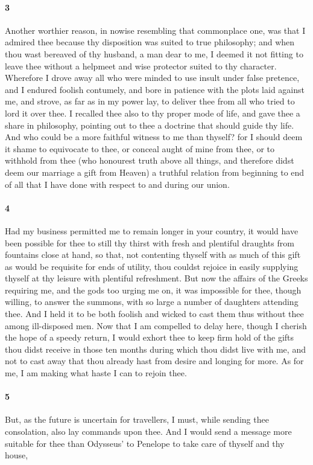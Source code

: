 \documentclass{article}
\begin{document}
\paragraph{3} Another worthier reason, in nowise resembling that commonplace one, was that I admired thee because thy disposition was suited to true philosophy; and when thou wast bereaved of thy husband, a man dear to me, I deemed it not fitting to leave thee without a helpmeet and wise protector suited to thy character. Wherefore I drove away all who were minded to use insult under false pretence, and I endured foolish contumely, and bore in patience with the plots laid against me, and strove, as far as in my power lay, to deliver thee from all who tried to lord it over thee. I recalled thee also to thy proper mode of life, and gave thee a share in philosophy, pointing out to thee a doctrine that should guide thy life. And who could be a more faithful witness to me than thyself? for I should deem it shame to equivocate to thee, or conceal aught of mine from thee, or to withhold from thee (who honourest truth above all things, and therefore didst deem our marriage a gift from Heaven) a truthful relation from beginning to end of all that I have done with respect to and during our union.

\paragraph{4} Had my business permitted me to remain longer in your country, it would have been possible for thee to still thy thirst with fresh and plentiful draughts from fountains close at hand, so that, not contenting thyself with as much of this gift as would be requisite for ends of utility, thou couldst rejoice in easily supplying thyself at thy leisure with plentiful refreshment. But now the affairs of the Greeks requiring me, and the gods too urging me on, it was impossible for thee, though willing, to answer the summons, with so large a number of daughters attending thee. And I held it to be both foolish and wicked to cast them thus without thee among ill-disposed men. Now that I am compelled to delay here, though I cherish the hope of a speedy return, I would exhort thee to keep firm hold of the gifts thou didst receive in those ten months during which thou didst live with me, and not to cast away that thou already hast from desire and longing for more. As for me, I am making what haste I can to rejoin thee.

\paragraph{5} But, as the future is uncertain for travellers, I must, while sending thee consolation, also lay commands upon thee. And I would send a message more suitable for thee than Odysseus' to Penelope to take care of thyself and thy house,
\end{document}
